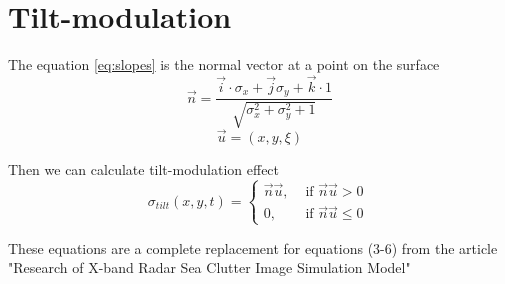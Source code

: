\section{Tilt-modulation}%
\label{sec:tilt_modulation}


The equation \eqref{eq:slopes} is the normal vector at a point on the surface
\begin{equation}
    \label{eq:}
    \vec n = \frac{\vec i \cdot \sigma_x+ \vec j \sigma_y + \vec k \cdot 1 }{\sqrt{\sigma_x^2 +
    \sigma_y^2 + 1}}
\end{equation}
\begin{equation}
    \label{eq:}
    \vec u = (x,y,\xi)
\end{equation}

Then we can calculate tilt-modulation effect 
\begin{equation}
    \label{eq:}
    \sigma_{tilt}(x,y,t) = \begin{cases}
        \vec n \vec u, &\text{ if } \vec n \vec u > 0\ \\ 
        0,  & \text{ if } \vec n \vec u \leq 0
        
    \end{cases} 
\end{equation}

These equations are a complete replacement for equations (3-6) from the article
"Research of X-band Radar Sea Clutter Image Simulation Model"





